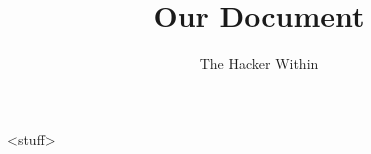 \documentclass[11pt]{article}
\author{The Hacker Within}
\title{Our Document}
\begin{document}
\maketitle
<stuff>
\end{document}

